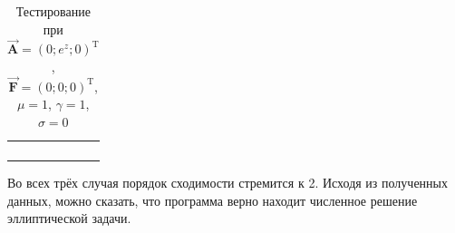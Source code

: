 \begin{table}
	\caption{Тестирование при $\overrightarrow{\textbf{A}} = (0; e^z; 0)^{\text{T}}$, $\overrightarrow{\textbf{F}} = (0; 0; 0)^{\text{T}}$, $\mu = 1$, $\gamma = 1$, $\sigma = 0$}
	\centering
	\small
	\begin{tabularx}{1.0\textwidth}{| >{\raggedright\arraybackslash}X | >{\raggedright\arraybackslash}X | >{\raggedright\arraybackslash}X |>{\raggedright\arraybackslash}X |}
		\hline
		\centering{Шаг по оси $z$} & \centering{Средняя погрешность} & \centering{$\text{log}_2\left(\frac{\sigma_{i-1}}{\sigma_i}\right)$} \tabularnewline \hline		
		
		\centering{$h$} & \centering{4.1223218E-001} & \centering{-} \tabularnewline \hline
		
		\centering{${}^h/_2$} & \centering{6.9015889E-002} & \centering{2.57845668} \tabularnewline \hline
		
		\centering{${}^h/_4$} & \centering{1.4360912E-002} & \centering{2.26478117} \tabularnewline \hline
		
		\centering{${}^h/_8$} & \centering{3.28952607E-003} & \centering{2.1261957} \tabularnewline \hline
		
	\end{tabularx}
	\label{tab:test14}
\end{table}

Во всех трёх случая порядок сходимости стремится к 2. Исходя из полученных данных, можно сказать, что программа верно находит численное решение эллиптической задачи.







